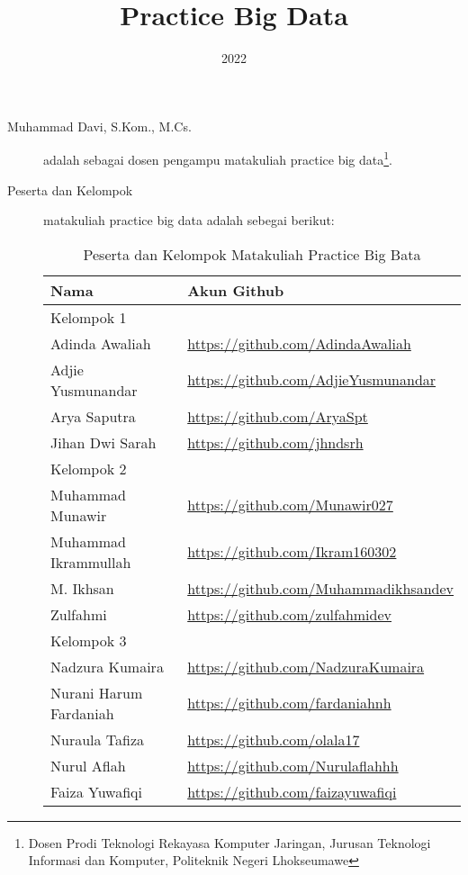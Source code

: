 \documentclass[a4paper]{tufte-handout}
\title{Practice Big Data}
\date{2022}
\begin{document}
\maketitle


\begin{projects}
	\begin{description}
		\item [Muhammad Davi, S.Kom., M.Cs.] adalah sebagai dosen pengampu matakuliah practice big data\footnote{Dosen Prodi Teknologi Rekayasa Komputer Jaringan, Jurusan Teknologi Informasi dan Komputer, Politeknik Negeri Lhokseumawe}.
		\item [Peserta dan Kelompok] matakuliah practice big data adalah sebegai berikut:

\begin{table}[!ht]
\caption{Peserta dan Kelompok Matakuliah Practice Big Bata}
\label{tab:peserta}
\centering
\begin{tabular}{ll} 
\toprule
Nama &	Akun Github\\
\midrule
Kelompok 1\\
\midrule
Adinda Awaliah			& \url{https://github.com/AdindaAwaliah} \\
Adjie Yusmunandar		& \url{https://github.com/AdjieYusmunandar} \\
Arya Saputra			& \url{https://github.com/AryaSpt} \\
Jihan Dwi Sarah			& \url{https://github.com/jhndsrh} \\
\midrule
Kelompok 2\\
\midrule
Muhammad Munawir		& \url{https://github.com/Munawir027} \\
Muhammad Ikrammullah	& \url{https://github.com/Ikram160302} \\
M. Ikhsan				& \url{https://github.com/Muhammadikhsandev} \\
Zulfahmi				& \url{https://github.com/zulfahmidev} \\
\midrule
Kelompok 3\\
\midrule
Nadzura Kumaira			& \url{https://github.com/NadzuraKumaira} \\
Nurani Harum Fardaniah	& \url{https://github.com/fardaniahnh} \\
Nuraula Tafiza			& \url{https://github.com/olala17} \\
Nurul Aflah				& \url{https://github.com/Nurulaflahhh} \\
Faiza Yuwafiqi			& \url{https://github.com/faizayuwafiqi} \\

\end{tabular}
\end{table}
\end{description}
\end{projects}
\end{document}
